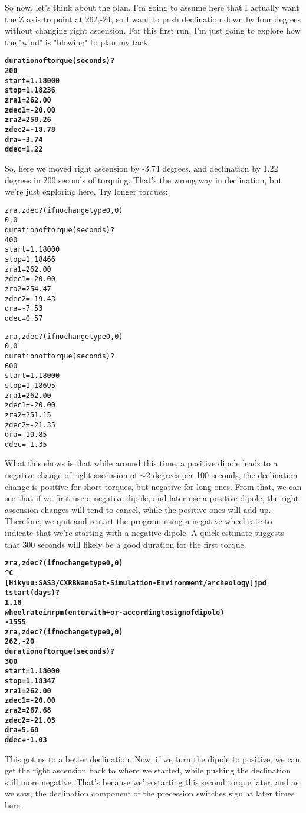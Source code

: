 \documentclass[11pt]{article}
\begin{document}
So now, let's think about the plan. I'm going to assume here that I actually want the Z axis to point at 262,-24, so I want to push declination down by four degrees without changing right ascension. For this first run, I'm just going to explore how the "wind" is "blowing" to plan my tack.
\begin{alltt}
\bfseries
      duration of torque (seconds)?
200
 start=     1.18000
 stop=     1.18236
 zra1= 262.00
 zdec1= -20.00
 zra2= 258.26
 zdec2= -18.78
 dra=  -3.74
 ddec=   1.22
\end{alltt}
So, here we moved right ascension by -3.74 degrees, and declination by 1.22 degrees in 200 seconds of torquing. That's the wrong way in declination, but we're just exploring here. Try longer torques:
\begin{alltt}
\bfseries
  
      zra,zdec? (if no change type 0,0)
0,0
      duration of torque (seconds)?
400
 start=     1.18000
 stop=     1.18466
 zra1= 262.00
 zdec1= -20.00
 zra2= 254.47
 zdec2= -19.43
 dra=  -7.53
 ddec=   0.57


      zra,zdec? (if no change type 0,0)
0,0
      duration of torque (seconds)?
600
 start=     1.18000
 stop=     1.18695
 zra1= 262.00
 zdec1= -20.00
 zra2= 251.15
 zdec2= -21.35
 dra= -10.85
 ddec=  -1.35
\end{alltt}
What this shows is that while around this time, a positive dipole leads to a negative change of right ascension of $\sim$2 degrees per 100 seconds, the declination change is positive for short torques, but negative for long ones. From that, we can see that if we first use a negative dipole, and later use a positive dipole, the right ascension changes will tend to cancel, while the positive ones will add up. Therefore, we quit and restart the program using a negative wheel rate to indicate that we're starting with a negative dipole. A quick estimate suggests that 300 seconds will likely be a good duration for the first torque.
\begin{alltt}
\bfseries
      zra,zdec? (if no change type 0,0)
^C
[Hikyuu:SAS3/CXRBNanoSat-Simulation-Environment/archeology] jpd% ./newmagnav
      tstart (days)?
1.18
      wheel rate in rpm (enter with + or - according to sign of dipole)
-1555
      zra,zdec? (if no change type 0,0)
262,-20
      duration of torque (seconds)?
300
 start=     1.18000
 stop=     1.18347
 zra1= 262.00
 zdec1= -20.00
 zra2= 267.68
 zdec2= -21.03
 dra=   5.68
 ddec=  -1.03
\end{alltt}
This got us to a better declination. Now, if we turn the dipole to positive, we can get the right ascension back to where we started, while pushing the declination still more negative. That's because we're starting this second torque later, and as we saw, the declination component of the precession switches sign at later times here.
\end{document}
